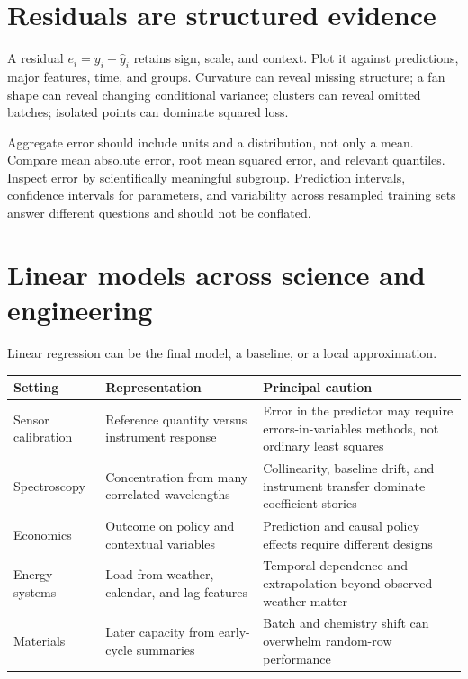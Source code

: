 \section{Residuals are structured evidence}

A residual $e_i=y_i-\widehat y_i$ retains sign, scale, and context. Plot it
against predictions, major features, time, and groups. Curvature can reveal
missing structure; a fan shape can reveal changing conditional variance;
clusters can reveal omitted batches; isolated points can dominate squared loss.

Aggregate error should include units and a distribution, not only a mean.
Compare mean absolute error, root mean squared error, and relevant quantiles.
Inspect error by scientifically meaningful subgroup. Prediction intervals,
confidence intervals for parameters, and variability across resampled training
sets answer different questions and should not be conflated.

\section{Linear models across science and engineering}

Linear regression can be the final model, a baseline, or a local approximation.

\begin{tabularx}{\textwidth}{@{}>{\raggedright\arraybackslash}p{}>{\raggedright\arraybackslash}p{}>{\raggedright\arraybackslash}X@{}}
\toprule
Setting & Representation & Principal caution \\
\midrule
Sensor calibration & Reference quantity versus instrument response & Error in
the predictor may require errors-in-variables methods, not ordinary least squares \\
Spectroscopy & Concentration from many correlated wavelengths & Collinearity,
baseline drift, and instrument transfer dominate coefficient stories \\
Economics & Outcome on policy and contextual variables & Prediction and causal
policy effects require different designs \\
Energy systems & Load from weather, calendar, and lag features & Temporal
dependence and extrapolation beyond observed weather matter \\
Materials & Later capacity from early-cycle summaries & Batch and chemistry
shift can overwhelm random-row performance \\
\bottomrule
\end{tabularx}

